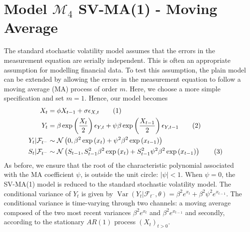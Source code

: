 \documentclass[11pt,a4,twosided,singlespacing,titlepagenumber=on]{scrreprt}
\numberwithin{equation}{chapter} %
\theoremstyle{remark}
\DeclareMathOperator{\var}{Var}
\newcommand\numberthis{\addtocounter{equation}{1}\tag{\theequation}}
\begin{document}
\section{Model $\mathcal{M}_4$ SV-MA(1) - Moving Average}
The standard stochastic volatility model assumes that the errors in the measurement equation are serially independent. This is often an appropriate assumption for modelling financial data. To test this assumption, the plain model can be extended by allowing the errors in the measurement equation to follow a moving average (MA) process of order $m$. Here, we choose a more simple specification and set $m = 1$. Hence, our model becomes
\begin{align*}
X_t									      &= \phi X_{t-1} + \sigma \epsilon_{X,t} \numberthis \\
Y_t									      &= \beta \exp \left( \frac{X_t}{2} \right) \epsilon_{Y,t} + \psi \beta \exp \left( \frac{X_{t-1}}{2} \right) \epsilon_{Y,t-1} \numberthis \\
Y_t	| \mathcal{F}_{t^-}		&\sim \mathcal{N} \left(0, \beta^2 \exp \left( x_t \right) + \psi^2 \beta^2 \exp \left( x_{t-1} \right) \right) \\
S_t | \mathcal{F}_{t^-}	  &\sim \mathcal{N} \left(S_{t-1}, S_{t-1}^2 \beta^2 \exp \left( x_t \right) +  S_{t-1}^2 \psi^2 \beta^2 \exp \left( x_{t-1} \right) \right) \numberthis
\end{align*}
As before, we ensure that the root of the characteristic polynomial associated with the MA coefficient $\psi$, is outside the unit circle: $|\psi| < 1$. When $\psi = 0$, the SV-MA(1) model is reduced to the standard stochastic volatility model. The conditional
variance of $Y_t$ is given by $\var \left(Y_t | \mathcal{F}_{t^-}, \theta \right) = \beta^2 e^{x_t} + \beta^2 \psi^2 e^{x_{t-1}}$. The conditional variance is time-varying through two channels: a moving average composed of the two most recent variances $\beta^2 e^{x_t}$ and $\beta^2 e^{x_{t-1}}$ and secondly, according to the stationary $AR(1)$ process $(X_t)_{t>0}$.
\end{document}
